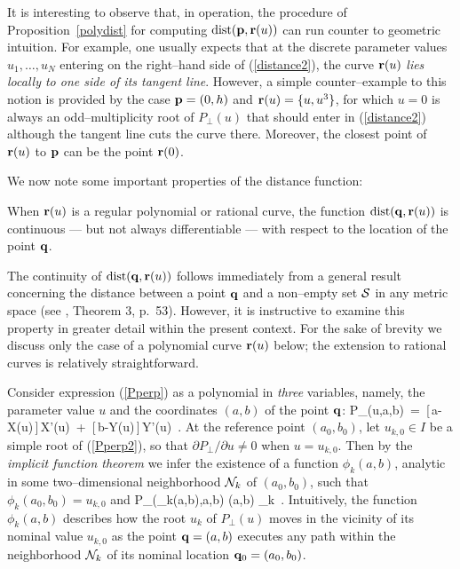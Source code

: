 \begin{exmpl}
{\rm
It is interesting to observe that, in operation, the procedure of
Proposition~\ref{polydist} for computing ${\rm dist}({\bf p},{\bf r}(u))$
can run counter to geometric intuition. For example, one usually
expects that at the discrete parameter values $u_1,\dots,u_N$
entering on the right--hand side of (\ref{distance2}), the curve
${\bf r}(u)$ {\it lies locally to one side of its tangent line}.
However, a simple counter--example to this notion is provided by
the case ${\bf p}=(0,h)$ and ${\bf r}(u)=\{u,u^3\}$, for which
$u=0$ is always an odd--multiplicity root of $P_\perp(u)$ that
should enter in (\ref{distance2}) although the tangent line cuts
the curve there.
Moreover, the closest point of 
${\bf r}(u)$ to ${\bf p}$ can be the point ${\bf r}(0)$.
} \QED
\end{exmpl}

We now note some important properties of the distance function:

\begin{propn}
When ${\bf r}(u)$ is a regular polynomial or rational curve, the
function ${\rm dist}({\bf q},{\bf r}(u))$ is continuous --- but not
always differentiable --- with respect to the location of the point
${\bf q}$.
\end{propn}

\prf The continuity of ${\rm dist}({\bf q},{\bf r}(u))$ follows immediately
from a general result concerning the distance between a point ${\bf q}$
and a non--empty set ${\cal S}$ in any metric space (see \cite{kelly79},
Theorem 3, p.~53). However, it is instructive to examine this property
in greater detail within the present context. For the sake of brevity
we discuss only the case of a polynomial curve ${\bf r}(u)$ below; the
extension to rational curves is relatively straightforward.

Consider expression (\ref{Pperp}) as a polynomial in {\it three\/}
variables, namely, the parameter value $u$ and the coordinates
$(a,b)$ of the point ${\bf q}$:
\be \label{Pperp2}
P_\perp(u,a,b) \,=\,
[\,a-X(u)\,]\,X'(u) \,+\, [\,b-Y(u)\,]\,Y'(u) \,.
\ee
At the reference point $(a_0,b_0)$, let $u_{k,0} \in I$ be a simple
root of (\ref{Pperp2}), so that $\partial P_\perp/\partial u\not=0$
when $u=u_{k,0}$. Then by the {\it implicit function theorem\/} \cite
[p.~362]{buck78} we infer the existence of a function $\phi_k(a,b)$,
analytic in some two--dimensional neighborhood ${\cal N}_k$ of
$(a_0,b_0)$, such that $\phi_k(a_0,b_0)=u_{k,0}$ and
\be
P_\perp(\phi_k(a,b),a,b) 
 (a,b) _k \,.
\ee
Intuitively, the function $\phi_k(a,b)$ describes how the root $u_k$
of $P_\perp(u)$ moves in the vicinity of its nominal value $u_{k,0}$
as the point ${\bf q}=(a,b)$ executes any path within the neighborhood
${\cal N}_k$ of its nominal location ${\bf q}_0=(a_0,b_0)$.

